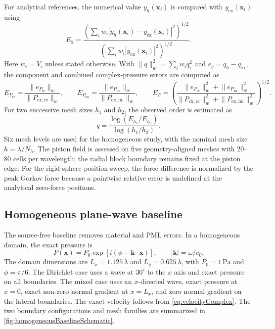 \documentclass[final,12pt,nopreprintline,longtitle]{elsarticle}
\newcommand{\x}{\mathbf{x}}
\begin{document}
For analytical references, the numerical value $y_h(\x_i)$ is compared with
$y_{\mathrm{ex}}(\x_i)$ using
\begin{equation}
    E_2 =
    \frac{\left(\sum_i w_i|y_h(\x_i)-y_{\mathrm{ex}}(\x_i)|^2\right)^{1/2}}
    {\left(\sum_i w_i|y_{\mathrm{ex}}(\x_i)|^2\right)^{1/2}}.
    \label{eq:errorMeasures}
\end{equation}
Here $w_i=V_i$ unless stated otherwise.  With $\lVert q\rVert_w^2=\sum_iw_iq_i^2$ and
$e_q=q_h-q_{\mathrm{ex}}$, the component and combined complex-pressure errors
are computed as
\begin{equation}
    E_{P_{\mathrm{re}}}
    =\frac{\lVert e_{P_{\mathrm{re}}}\rVert_w}
           {\lVert P_{\mathrm{ex},\mathrm{re}}\rVert_w},
    \qquad
    E_{P_{\mathrm{im}}}
    =\frac{\lVert e_{P_{\mathrm{im}}}\rVert_w}
           {\lVert P_{\mathrm{ex},\mathrm{im}}\rVert_w},
    \qquad
    E_P
    =\left(
      \frac{\lVert e_{P_{\mathrm{re}}}\rVert_w^2
           +\lVert e_{P_{\mathrm{im}}}\rVert_w^2}
           {\lVert P_{\mathrm{ex},\mathrm{re}}\rVert_w^2
           +\lVert P_{\mathrm{ex},\mathrm{im}}\rVert_w^2}
      \right)^{1/2}.
    \label{eq:complexPressureErrors}
\end{equation}
For two successive mesh sizes $h_1$ and $h_2$, the observed order is estimated
as
\begin{equation}
    q=\frac{\log(E_{h_1}/E_{h_2})}{\log(h_1/h_2)}.
    \label{eq:observedOrder}
\end{equation}
Six mesh levels are used for the homogeneous study, with the nominal mesh size
$h=\lambda/N_\lambda$.  The piston field is assessed on five
geometry-aligned meshes with 20--80 cells per
wavelength; the radial block boundary remains fixed at the piston edge.  For
the rigid-sphere position sweep, the force
difference is normalized by the peak
Gorkov force because a pointwise relative error is undefined at the analytical
zero-force positions.

\subsection{Homogeneous plane-wave baseline}
\label{sec:homogeneousBaseline}

The source-free baseline removes material and PML errors.  In a homogeneous
domain, the exact pressure is
\begin{equation}
    P(\x)=P_0\exp\!\left[i(\phi-\mathbf{k}\cdot\x)\right],
    \qquad |\mathbf{k}|=\omega/c_0.
    \label{eq:homogeneousPlaneWave}
\end{equation}
The domain dimensions are $L_x=1.125\, \lambda$ and
$L_y=0.625\, \lambda$, with $P_0=1\,\mathrm{Pa}$ and $\phi=\pi/6$.
The Dirichlet case uses a wave at $30^\circ$ to the $x$ axis and exact pressure
on all boundaries.  The mixed case uses an $x$-directed wave, exact pressure at
$x=0$, exact non-zero normal gradient at $x=L_x$, and zero normal gradient on
the lateral boundaries.  The exact velocity follows from
\cref{eq:velocityComplex}.  The two boundary configurations and mesh families
are summarized in \cref{fig:homogeneousBaselineSchematic}.
\end{document}

